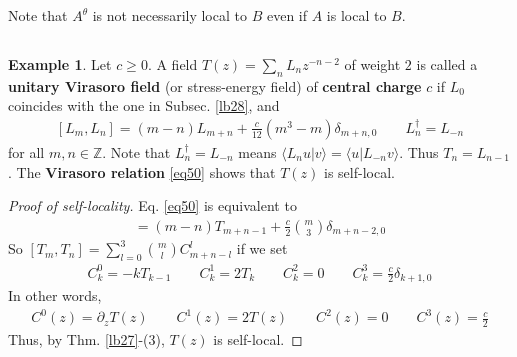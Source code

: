 \documentclass[12pt,b5paper,notitlepage]{article}
\theoremstyle{definition}
\newtheorem{eg}[df]{Example}
\theoremstyle{plain}
\newcommand{\bk}[1]{\langle {#1}\rangle}
\newcommand{\Zbb}{\mathbb Z}
\numberwithin{equation}{section}
\begin{document}
Note that $A^\theta$ is not necessarily local to $B$ even if $A$ is local to $B$.




\subsection{}


\begin{eg}\label{lb40}
Let $c\geq0$. A field $T(z)=\sum_n  L_nz^{-n-2}$ of weight $2$ is called a \textbf{unitary Virasoro field}  (or stress-energy field) of \textbf{central charge} $c$  if $L_0$ coincides with the one in Subsec. \ref{lb28}, and
\begin{align}\label{eq50}
[L_m,L_n]=(m-n)L_{m+n}+\frac c{12}(m^3-m)\delta_{m+n,0}\qquad L_n^\dagger=L_{-n}
\end{align}
for all $m,n\in\Zbb$. Note that $L_n^\dagger=L_{-n}$ means $\bk{L_nu|v}=\bk{u|L_{-n}v}$. Thus $T_n=L_{n-1}$. The \textbf{Virasoro relation} \eqref{eq50} shows that $T(z)$ is self-local.
\end{eg}


\begin{proof}[Proof of self-locality]
Eq. \eqref{eq50} is equivalent to
\begin{align*}
[T_m,T_n]=(m-n)T_{m+n-1}+\frac c2{m\choose 3}\delta_{m+n-2,0}
\end{align*}
So $[T_m,T_n]=\sum_{l=0}^3{m\choose l}C^l_{m+n-l}$ if we set
\begin{align*}
C^0_k=-kT_{k-1} \qquad  C^1_k=2T_k\qquad C^2_k=0\qquad C^3_k=\frac c2\delta_{k+1,0}
\end{align*}
In other words,
\begin{align*}
C^0(z)=\partial_zT(z)\qquad C^1(z)=2T(z)\qquad C^2(z)=0\qquad C^3(z)=\frac c2
\end{align*}
Thus, by Thm. \ref{lb27}-(3), $T(z)$ is self-local.
\end{proof}


\subsection{}
\end{document}
